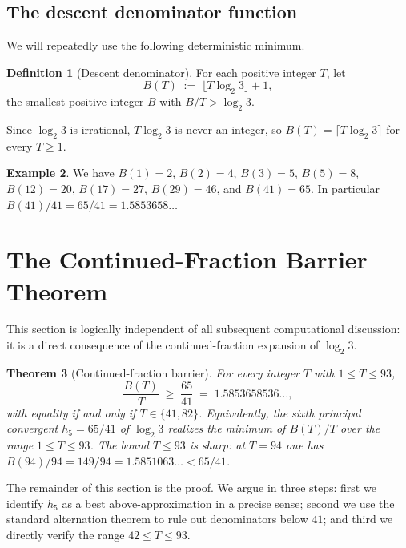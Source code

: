 \documentclass[11pt,a4paper]{article}
\newtheorem{theorem}{Theorem}[section]
\theoremstyle{definition}
\newtheorem{definition}[theorem]{Definition}
\newtheorem{example}[theorem]{Example}
\theoremstyle{remark}
\begin{document}
\subsection{The descent denominator function}

We will repeatedly use the following deterministic minimum.

\begin{definition}[Descent denominator]\label{def:Bmin}
For each positive integer $T$, let
\[
  B(T) \;:=\; \lfloor T \log_2 3 \rfloor + 1,
\]
the smallest positive integer $B$ with $B / T > \log_2 3$.
\end{definition}

Since $\log_2 3$ is irrational, $T \log_2 3$ is never an integer, so
$B(T) = \lceil T \log_2 3 \rceil$ for every $T \geq 1$.

\begin{example}\label{ex:Bsmall}
We have $B(1) = 2$, $B(2) = 4$, $B(3) = 5$, $B(5) = 8$, $B(12) = 20$,
$B(17) = 27$, $B(29) = 46$, and $B(41) = 65$.  In particular
$B(41)/41 = 65/41 = 1.5853658\ldots$
\end{example}

\section{The Continued-Fraction Barrier Theorem}\label{sec:cf}

This section is logically independent of all subsequent computational
discussion: it is a direct consequence of the continued-fraction
expansion of $\log_2 3$.

\begin{theorem}[Continued-fraction barrier]\label{thm:cf}
For every integer $T$ with $1 \leq T \leq 93$,
\begin{equation}\label{eq:cf-bound}
  \frac{B(T)}{T} \;\geq\; \frac{65}{41} \;=\; 1.5853658536\ldots,
\end{equation}
with equality if and only if $T \in \{41, 82\}$.  Equivalently, the
sixth principal convergent $h_5 = 65/41$ of $\log_2 3$ realizes the
minimum of $B(T)/T$ over the range $1 \leq T \leq 93$.  The bound
$T \leq 93$ is sharp: at $T = 94$ one has
$B(94)/94 = 149/94 = 1.5851063\ldots < 65/41$.
\end{theorem}

The remainder of this section is the proof.  We argue in three steps:
first we identify $h_5$ as a best above-approximation in a precise
sense; second we use the standard alternation theorem to rule out
denominators below $41$; and third we directly verify the range
$42 \leq T \leq 93$.
\end{document}
